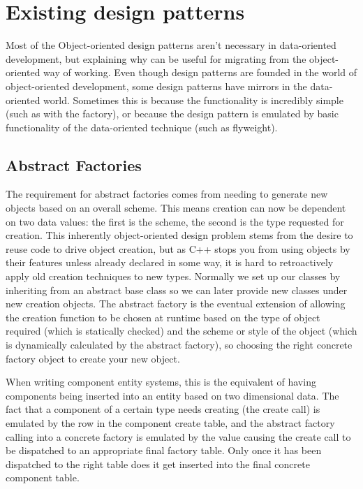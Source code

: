 \section{Existing design patterns}

Most of the Object-oriented design patterns aren't necessary in data-oriented
development, but explaining why can be useful for migrating from the
object-oriented way of working. Even though design patterns are founded in the
world of object-oriented development, some design patterns have mirrors in the
data-oriented world. Sometimes this is because the functionality is incredibly
simple (such as with the factory), or because the design pattern is emulated by
basic functionality of the data-oriented technique (such as flyweight).

\subsection{Abstract Factories}

The requirement for abstract factories comes from needing to generate new
objects based on an overall scheme. This means creation can now be dependent on
two data values: the first is the scheme, the second is the type requested for
creation. This inherently object-oriented design problem stems from the desire
to reuse code to drive object creation, but as C++ stops you from using objects
by their features unless already declared in some way, it is hard to
retroactively apply old creation techniques to new types. Normally we set up
our classes by inheriting from an abstract base class so we can later provide
new classes under new creation objects. The abstract factory is the eventual
extension of allowing the creation function to be chosen at runtime based on
the type of object required (which is statically checked) and the scheme or
style of the object (which is dynamically calculated by the abstract factory),
so choosing the right concrete factory object to create your new object.

When writing component entity systems, this is the equivalent of having
components being inserted into an entity based on two dimensional data. The
fact that a component of a certain type needs creating (the create call) is
emulated by the row in the component create table, and the abstract factory
calling into a concrete factory is emulated by the value causing the create
call to be dispatched to an appropriate final factory table. Only once it has
been dispatched to the right table does it get inserted into the final concrete
component table.

